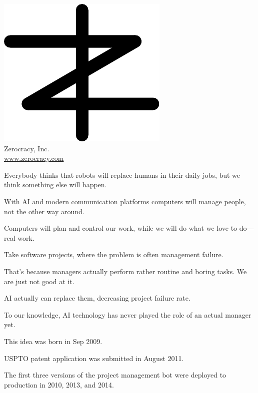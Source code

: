 \documentclass{article}
\begin{document}

\pagecolor{white}
\newcommand\slide[1]{%
  \pagebreak\topskip0pt\vspace*{\fill}%
  \begin{center}\Huge%
  #1
  \end{center}%
  \vspace*{\fill}%
}

\slide{\includegraphics[scale=1]{../images/zerocracy-logo.pdf}\\
Zerocracy, Inc.\\[1em]
\large \href{https://www.zerocracy.com}{www.zerocracy.com}}

\slide{Everybody thinks that robots will replace humans in their daily jobs, but we think something else will happen.}

\slide{With AI and modern communication platforms computers will manage people, not the other way around.}

\slide{Computers will plan and control our work, while we will do what we love to do---real work.}

\slide{Take software projects, where the problem is often management failure.}

\slide{That’s because managers actually perform rather routine and boring tasks. We are just not good at it.}

\slide{AI actually can replace them, decreasing project failure rate.}

\slide{To our knowledge, AI technology has never played the role of an actual manager yet.}

\slide{This idea was born in Sep 2009.}

\slide{USPTO patent application was submitted in August 2011.\quad{\large US 12/703,202}}

\slide{The first three versions of the project management bot were deployed to production in 2010, 2013, and 2014.}
\end{document}
